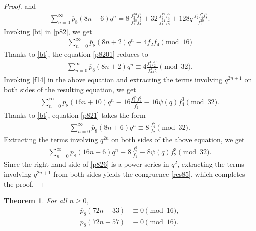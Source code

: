 \documentclass[11pt, reqno]{amsart}
\newtheorem{theorem}{Theorem}[section]
\numberwithin{equation}{section}
\begin{document}
\begin{proof}
		and 
		\begin{align}
			\sum_{n=0}^{\infty}\overline{p}_{8}(8n+6)q^n= 8\,\frac{f_2^{33}f_{8}^2}{f_1^{28}f_4^9} 
			+32\,\frac{f_2^{19}f_4^5}{f_1^{24}f_{8}^2} 
			+ 128q\,\frac{f_2^9 f_4^7 f_{8}^2}{f_1^{20}}\label{p821}.
		\end{align}
		Invoking \eqref{bt} in \eqref{p82}, we get
		\begin{align}
			\sum_{n=0}^{\infty}\overline{p}_{8}(8n+2)q^n\equiv4{f_2f_4} 
			\pmod{16}\label{p822}
		\end{align}
		Thanks to \eqref{bt}, the equation \eqref{p8201} reduces to
		\begin{align}
			\sum_{n=0}^{\infty}\overline{p}_{8}(8n+2)q^n\equiv4\frac{f_1^4f_2^{15}}{f_4^3 f_{8}^2} \pmod{32}.
			\label{p823}
		\end{align}
		Invoking \eqref{f14} in the above equation and extracting the terms involving $q^{2n+1}$ on both sides of the resulting equation, we get
		\begin{align}
			\sum_{n=0}^{\infty}\overline{p}_{8}(16n+10)q^n\equiv16\frac{f_1^{17}f_4^{2}}{f_2^5}\equiv16\psi(q)f_4^3 \pmod{32}.
			\label{p824}
		\end{align}
		Thanks to \eqref{bt}, equation \eqref{p821} takes the form
		\begin{align}
			\sum_{n=0}^{\infty}\overline{p}_{8}(8n+6)q^n\equiv 8\,\frac{f_4^{5}}{f_2}\pmod{32}.\label{p826}
		\end{align}
		Extracting the terms involving $q^{2n}$ on both sides of the above equation, we get
		\begin{align}
			\sum_{n=0}^{\infty}\overline{p}_{8}(16n+6)q^n\equiv 8\,\frac{f_2^{5}}{f_1}\equiv8\psi(q)f_2^3\pmod{32}.\label{p825}
		\end{align}
		Since the right-hand side of \eqref{p826} is a power series in $q^2$, extracting the terms involving $q^{2n+1}$ from both sides yields the congruence \eqref{res85}, which completes the proof.
	\end{proof}
	\begin{theorem}\label{thf1f2}
		For all $n\geq0$,
		\begin{align}
			\overline{p}_{8}(72n+33)&\equiv0\pmod{16},\label{p8new1}\\
			\overline{p}_{8}(72n+57)&\equiv0\pmod{16}.\label{p8new2}
		\end{align}
	\end{theorem}
\end{document}
